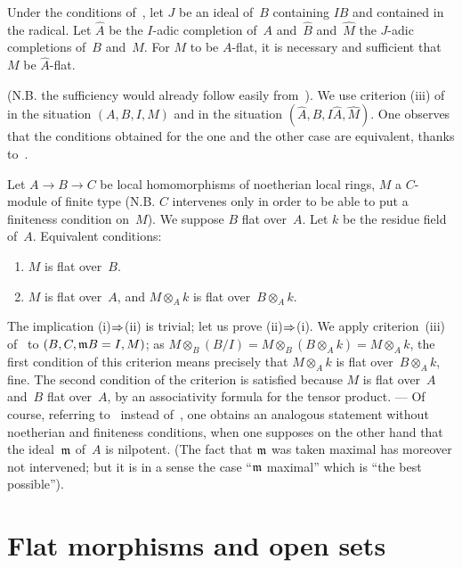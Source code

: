 \begin{corollary}
\label{IV.5.8}
Under the conditions of~, let $J$ be an ideal of~$B$
containing $IB$ and contained in the radical. Let $\hat A$ be the
$I$-adic completion of~$A$ and~$\hat B$ and~$\hat M$ the
$J$-adic completions of~$B$ and~$M$. For $M$ to be
$A$-flat, it is necessary and sufficient that $M$ be $\hat A$-flat.
\end{corollary}

(N.B. the sufficiency would already follow easily
from~). We use criterion (iii) of~
in the situation $(A,B,I,M)$ and in the situation $(\hat A,\hat
B,I\hat A, \hat M)$. One observes that the conditions obtained for
the one and the other case are equivalent, thanks
to~.

\begin{corollary}
\label{IV.5.9}
Let $A\to B\to C$ be local homomorphisms of noetherian local
rings, $M$ a $C$-module of finite type (N.B. $C$
intervenes only in order to be able to put a finiteness condition on~$M$). We suppose $B$ flat over~$A$. Let $k$ be the residue field
of~$A$. Equivalent conditions:
%
\begin{enumerate}
\item[(i)] $M$ is flat over~$B$.
\item[(ii)] $M$ is flat over~$A$, and $M\otimes_A k$ is flat over~$B\otimes_A k$.
\end{enumerate}
\end{corollary}

The implication (i)$\To$(ii) is trivial; let us prove
(ii)$\To$(i). We apply criterion~(iii)
of~ to $(B,C,\mathfrak{m}B=I,M)$; as
$M\otimes_B(B/I)=M\otimes_B(B\otimes_A k) = M\otimes_A k$, the
first condition of this criterion means precisely
that $M\otimes_A k$ is flat over~$B\otimes_A k$,
fine. The second condition of the criterion is
satisfied because $M$ is flat over~$A$ and~$B$ flat over~$A$,
by an associativity formula for the tensor product. --- Of
course, referring to~ instead
of~, one obtains an analogous statement without noetherian
and finiteness conditions, when one supposes on the other hand that
the ideal~$\mathfrak{m}$ of~$A$ is nilpotent. (The fact that $\mathfrak{m}$
was taken maximal has moreover not intervened; but
it is in a sense the case ``$\mathfrak{m}$ maximal'' which is ``the best
possible'').

\section{Flat morphisms and open sets}
\label{IV.6}

